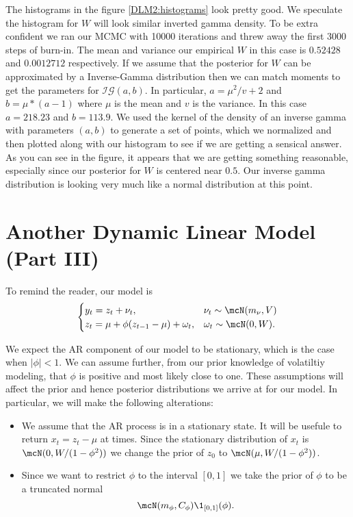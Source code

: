 \documentclass{article}
\begin{document}
The histograms in the figure \ref{DLM2:histograms} look pretty good.  We speculate the histogram for $W$ will look similar inverted gamma density.  To be extra confident we ran our MCMC with 10000 iterations and threw away the first 3000 steps of burn-in.  The mean and variance our empirical $W$ in this case is $0.52428$ and $0.0012712$ respectively.  If we assume that the posterior for $W$ can be approximated by a Inverse-Gamma distribution then we can match moments to get the parameters for $\mathcal{IG}(a,b)$.  In particular, $a = \mu^2/v + 2$ and $b = \mu*(a-1)$ where $\mu$ is the mean and $v$ is the variance.  In this case $a = 218.23$ and $b = 113.9$.  We used the kernel of the density of an inverse gamma with parameters $(a,b)$ to generate a set of points, which we normalized and then plotted along with our histogram to see if we are getting a sensical answer.  As you can see in the figure, it appears that we are getting something reasonable, especially since our posterior for $W$ is centered near $0.5$.  Our inverse gamma distribution is looking very much like a normal distribution at this point.

\begin{figure}[!h]
\begin{center}
\end{center}
\end{figure}

\section{Another Dynamic Linear Model (Part III)}

To remind the reader, our model is
\[
\begin{cases}
y_t = z_t + \nu_t, & \nu_t \sim \mcN(m_\nu, V) \\
z_t = \mu + \phi (z_{t-1} - \mu) + \omega_t, & \omega_t \sim \mcN(0, W).
\end{cases}
\]

We expect the AR component of our model to be stationary, which is the case when $|\phi| < 1$.  We can assume further, from our prior knowledge of volatiltiy modeling, that $\phi$ is positive and most likely close to one.  These assumptions will affect the prior and hence posterior distributions we arrive at for our model.  In particular, we will make the following alterations:
\begin{itemize}
\item We assume that the AR process is in a stationary state.  It will be usefule to return $x_t = z_t - \mu$ at times.  Since the stationary distribution of $x_t$ is $\mcN(0, W/(1-\phi^2))$ we change the prior of $z_0$ to $\mcN(\mu, W / (1-\phi^2))$.
\item Since we want to restrict $\phi$ to the interval $[0,1]$ we take the prior of $\phi$ to be a truncated normal
\[
\mcN(m_\phi, C_\phi) \1_{[0,1]}(\phi).
\]
\end{itemize}
\end{document}
